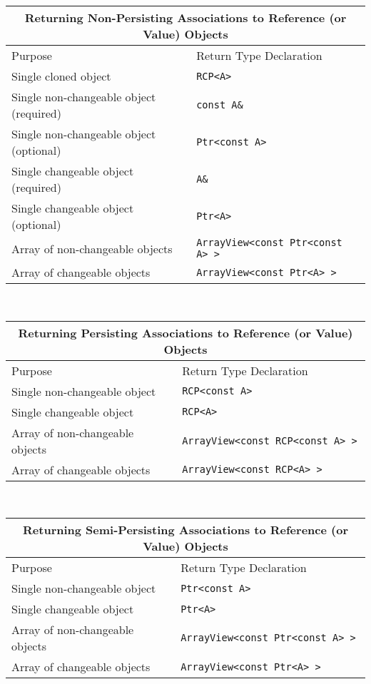 \begin{tabular}{|l|l|}
%
\multicolumn{2}{c}{\textbf{Returning Non-Persisting Associations to Reference (or Value) Objects }} \\
%
\hline
Purpose
& Return Type Declaration \\
\hline
\hline
Single cloned object
& {}\texttt{RCP<A>} \\
\hline
Single non-changeable object (required)
& {}\texttt{const A\&} \\
\hline
Single non-changeable object (optional)
& {}\texttt{Ptr<const A>} \\
\hline
Single changeable object (required)
& {}\texttt{A\&} \\
\hline
Single changeable object (optional)
& {}\texttt{Ptr<A>} \\
\hline
Array of non-changeable objects
& {}\texttt{ArrayView<const Ptr<const A> >} \\
\hline
Array of changeable objects
& {}\texttt{ArrayView<const Ptr<A> >} \\
\hline
%
\end{tabular} \\[3ex]
%
\begin{tabular}{|l|l|}
%
\multicolumn{2}{c}{\textbf{Returning Persisting Associations to Reference (or Value) Objects}} \\
%
\hline
Purpose
& Return Type Declaration \\
\hline
\hline
Single non-changeable object
& {}\texttt{RCP<const A>} \\
\hline
Single changeable object
& {}\texttt{RCP<A>} \\
\hline
Array of non-changeable objects
& {}\texttt{ArrayView<const RCP<const A> >} \\
\hline
Array of changeable objects
& {}\texttt{ArrayView<const RCP<A> >} \\
\hline
\end{tabular} \\[3ex]
%
\begin{tabular}{|l|l|}
%
\multicolumn{2}{c}{\textbf{Returning Semi-Persisting Associations to Reference (or Value) Objects}} \\
%
\hline
Purpose
& Return Type Declaration \\
\hline
\hline
Single non-changeable object
& {}\texttt{Ptr<const A>} \\
\hline
Single changeable object
& {}\texttt{Ptr<A>} \\
\hline
Array of non-changeable objects
& {}\texttt{ArrayView<const Ptr<const A> >} \\
\hline
Array of changeable objects
& {}\texttt{ArrayView<const Ptr<A> >} \\
\hline
\end{tabular}
